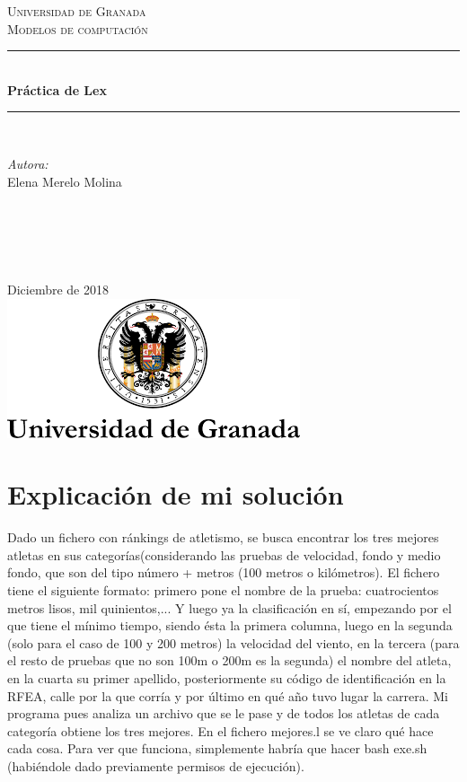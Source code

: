 \documentclass[12pt]{article}
\begin{document}
\begin{titlepage}
\newcommand{\HRule}{\rule{\linewidth}{0.5mm}}
\center
\textsc{\LARGE Universidad de Granada}\\[1.5cm] %
\textsc{\Large Modelos de computación}\\[0.5cm] %
\HRule \\[0.4cm]
{ \huge \bfseries Práctica de Lex}\\[0.4cm] %
\HRule \\[1.5cm]
\begin{minipage}{0.4\textwidth}
\begin{flushleft} \large
\emph{Autora:}\\
Elena Merelo Molina \textsc{} %
\end{flushleft}
\end{minipage}
~
\begin{minipage}{0.4\textwidth}
\begin{flushright} \large
\emph{} \\
\textsc{} %
\end{flushright}
\end{minipage}\\[2cm]
{\large Diciembre de 2018}\\[2cm] %
\includegraphics[scale=0.5]{./logo.png}
\vfill %
\end{titlepage}


\section{Explicación de mi solución}
Dado un fichero con ránkings de atletismo, se busca encontrar los tres mejores atletas en sus categorías(considerando las pruebas de velocidad, fondo y medio fondo, que son del tipo número + metros (100 metros o kilómetros). El fichero tiene el siguiente formato: primero pone el nombre de la prueba: cuatrocientos metros lisos, mil quinientos,... Y luego ya la clasificación en sí, empezando por el que tiene el mínimo tiempo, siendo ésta la primera columna, luego en la segunda (solo para el caso de 100 y 200 metros) la velocidad del viento, en la tercera (para el resto de pruebas que no son 100m o 200m es la segunda) el nombre del atleta, en la cuarta su primer apellido, posteriormente su código de identificación en la RFEA, calle por la que corría y por último en qué año tuvo lugar la carrera. Mi programa pues analiza un archivo que se le pase y de todos los atletas de cada categoría obtiene los tres mejores. En el fichero mejores.l se ve claro qué hace cada cosa.
Para ver que funciona, simplemente habría que hacer bash exe.sh (habiéndole dado previamente permisos de ejecución).
\end{document}
